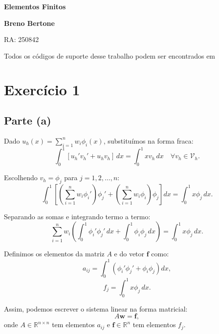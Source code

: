 \documentclass{article}
\begin{document}
\begin{titlepage}
    \centering
    \vspace*{2cm}
    
    \Huge
    \textbf{Elementos Finitos}
    
    \vspace{1.5cm}
    
    \Large
    \textbf{Breno Bertone}
    
    \vspace{0.5cm}
    
    \Large
    RA: 250842
    
    \vfill
    
    \vspace{0.8cm}
    
    
    \vspace{1.5cm}    
    
\end{titlepage}

Todos os códigos de suporte desse trabalho podem ser encontrados em 

\section{Exercício 1}
\subsection{Parte (a)}

Dado \( u_h(x) = \sum_{i=1}^n w_i \phi_i(x) \), substituímos na forma fraca:
\[
\int_0^1 [u_h' v_h' + u_h v_h] \, dx = \int_0^1 x v_h \, dx \quad \forall v_h \in \mathcal{V}_h.
\]

Escolhendo \( v_h = \phi_j \) para \( j = 1, 2, \ldots, n \):
\[
\int_0^1 \left[ \left( \sum_{i=1}^n w_i \phi_i' \right) \phi_j' + \left( \sum_{i=1}^n w_i \phi_i \right) \phi_j \right] dx = \int_0^1 x \phi_j \, dx.
\]

Separando as somas e integrando termo a termo:
\[
\sum_{i=1}^n w_i \left( \int_0^1 \phi_i' \phi_j' \, dx + \int_0^1 \phi_i \phi_j \, dx \right) = \int_0^1 x \phi_j \, dx.
\]

Definimos os elementos da matriz \( A \) e do vetor \( \mathbf{f} \) como:
\[
a_{ij} = \int_0^1 \left( \phi_i' \phi_j' + \phi_i \phi_j \right) dx,
\]
\[
f_j = \int_0^1 x \phi_j \, dx.
\]

Assim, podemos escrever o sistema linear na forma matricial:
\[
A \mathbf{w} = \mathbf{f},
\]
onde \( A \in \mathbb{R}^{n \times n} \) tem elementos \( a_{ij} \) e \( \mathbf{f} \in \mathbb{R}^n \) tem elementos \( f_j \).
\end{document}
